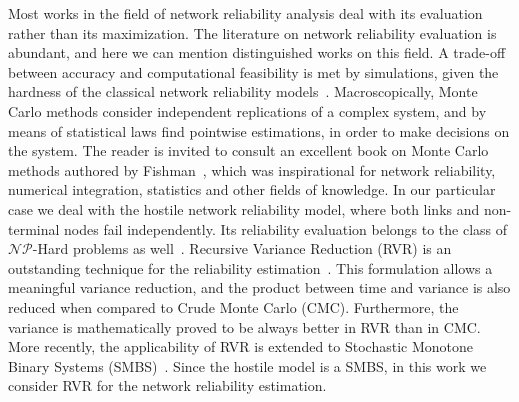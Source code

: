 \documentclass{llncs}
\begin{document}
Most works in the field of network reliability analysis deal with its evaluation rather than its maximization. The literature on network reliability evaluation is abundant, and here we can mention distinguished works on this field. A trade-off between accuracy and computational feasibility is met by simulations, 
given the hardness of the classical network reliability models~\cite{9}. Macroscopically, Monte Carlo methods 
consider independent replications of a complex system, and by means of statistical laws find pointwise 
estimations, in order to make decisions on the system. The reader is invited to consult an excellent book on 
Monte Carlo methods authored by Fishman~\cite{105}, which was inspirational for network reliability, numerical integration, statistics and other fields of knowledge. In our particular case we deal with the 
hostile network reliability model, where both links and non-terminal nodes fail independently. Its reliability evaluation belongs to the class of $\mathcal{NP}$-Hard problems as well~\cite{9}. Recursive Variance Reduction (RVR) is an outstanding technique for the reliability estimation~\cite{85}. This formulation allows a meaningful variance reduction, and the product between time and variance is also reduced when compared to Crude Monte Carlo (CMC). Furthermore, the variance is mathematically proved to be always better in RVR than in CMC. More recently, the applicability of RVR is extended to Stochastic Monotone Binary Systems (SMBS)~\cite{82}. Since the hostile model is a SMBS, in this work we consider RVR for the network reliability estimation.
  
\end{document}
